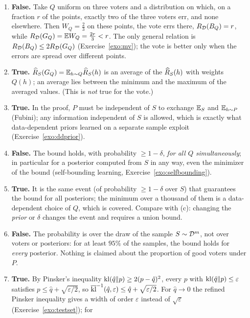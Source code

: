 \documentclass[11pt]{article}
\newcounter{exo}
\begin{document}
\begin{solution}
\begin{enumerate}[label=(\alph*)]
\item \textbf{False.} Take $Q$ uniform on three voters and a distribution on which, on a fraction $r$ of the points,
      exactly two of the three voters err, and none elsewhere. Then $W_Q=\frac23$ on these points, the vote errs there,
      $R_{\mathcal{D}}(B_{Q})=r$, while $R_{\mathcal{D}}(G_{Q})=\mathbb{E} W_Q=\frac{2r}3<r$. The only general relation is $R_{\mathcal{D}}(B_{Q})\leq2R_{\mathcal{D}}(G_{Q})$
      (Exercise~\ref{exo:mv}); the vote is better only when the errors are spread over different points.
\item \textbf{True.} $\widehat{R}_{S}(G_{Q})=\mathbb{E}_{h\sim Q}\widehat{R}_{S}(h)$ is an average of the $\widehat{R}_{S}(h)$ with weights $Q(h)$; an average lies
      between the minimum and the maximum of the averaged values. (This is \emph{not} true for the vote.)
\item \textbf{True.} In the proof, $P$ must be independent of $S$ to exchange $\mathbb{E}_{S}$ and $\mathbb{E}_{h\sim P}$ (Fubini); any
      information independent of $S$ is allowed, which is exactly what data-dependent priors learned on a separate
      sample exploit (Exercise~\ref{exo:ddprior}).
\item \textbf{False.} The bound holds, with probability $\geq1-\delta$, \emph{for all $Q$ simultaneously}; in
      particular for a posterior computed from $S$ in any way, even the minimizer of the bound (self-bounding learning,
      Exercise~\ref{exo:selfbounding}).
\item \textbf{True.} It is the same event (of probability $\geq1-\delta$ over $S$) that guarantees the bound for all
      posteriors; the minimum over a thousand of them is a data-dependent choice of $Q$, which is covered.
      Compare with (c): changing the \emph{prior} or $\delta$ changes the event and requires a union bound.
\item \textbf{False.} The probability is over the draw of the sample $S\sim\mathcal{D}^m$, not over voters or posteriors:
      for at least $95\%$ of the samples, the bound holds for \emph{every} posterior. Nothing is claimed about the
      proportion of good voters under $P$.
\item \textbf{True.} By Pinsker's inequality $\operatorname{kl}(\hat q\|p)\geq2(p-\hat q)^2$, every $p$ with $\operatorname{kl}(\hat q\|p)\leq\varepsilon$
      satisfies $p\leq\hat q+\sqrt{\varepsilon/2}$, so $\overline{\operatorname{kl}}^{-1}(\hat q,\varepsilon)\leq\hat q+\sqrt{\varepsilon/2}$. For $\hat q\to0$ the refined
      Pinsker inequality gives a width of order $\varepsilon$ instead of $\sqrt\varepsilon$ (Exercise~\ref{exo:testset}); for

\end{enumerate}
\end{solution}
\end{document}
